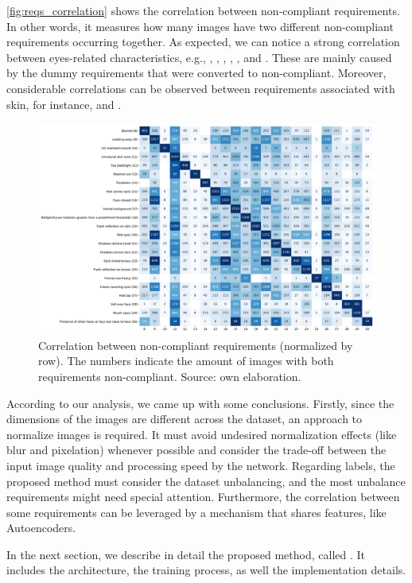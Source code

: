 \autoref{fig:reqs_correlation} shows the correlation between non-compliant requirements. In other words, it measures how many images have two different non-compliant requirements occurring together. As expected, we can notice a strong correlation between eyes-related characteristics, e.g., \lookingaway, \hairacrosseyes, \eyesclosed, \redeyes, \darktintedlenses, and \framecoveringeyes. These are mainly caused by the dummy requirements that were converted to non-compliant. Moreover, considerable correlations can be observed between requirements associated with skin, for instance, \unnaturalskintone and \flashskin. 

\begin{figure}
\centering
\includegraphics[width=\linewidth]{images/reqs_correlation.pdf}
\caption{Correlation between non-compliant requirements (normalized by row). The numbers indicate the amount of images with both requirements non-compliant. Source: own elaboration.}
\label{fig:reqs_correlation}
\end{figure}

According to our analysis, we came up with some conclusions. Firstly, since the dimensions of the images are different across the dataset, an approach to normalize images is required. It must avoid undesired normalization effects (like blur and pixelation) whenever possible and consider the trade-off between the input image quality and processing speed by the network. Regarding labels, the proposed method must consider the dataset unbalancing, and the most unbalance requirements might need special attention. Furthermore, the correlation between some requirements can be leveraged by a mechanism that shares features, like Autoencoders.

In the next section, we describe in detail the proposed method, called \methodname. It includes the architecture, the training process, as well the implementation details.

